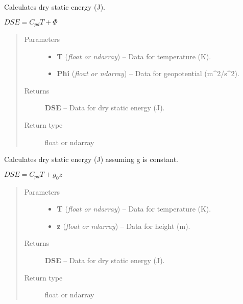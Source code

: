 \documentclass[letterpaper,10pt,english]{sphinxmanual}
\begin{document}

\begin{fulllineitems}
\label{atmos:atmos.equations.DSE_from_T_Phi}
Calculates dry static energy (J).

\(DSE = C_{pd} T + \Phi\)
\begin{quote}\begin{description}
\item[{Parameters}] \leavevmode\begin{itemize}
\item {} 
\textbf{T} (\emph{float or ndarray}) -- Data for temperature (K).

\item {} 
\textbf{Phi} (\emph{float or ndarray}) -- Data for geopotential (m\textasciicircum{}2/s\textasciicircum{}2).

\end{itemize}

\item[{Returns}] \leavevmode
\textbf{DSE} --
Data for dry static energy (J).

\item[{Return type}] \leavevmode
float or ndarray

\end{description}\end{quote}

\end{fulllineitems}


\begin{fulllineitems}
\label{atmos:atmos.equations.DSE_from_T_z}
Calculates dry static energy (J) assuming g is constant.

\(DSE = C_{pd} T + g_0 z\)
\begin{quote}\begin{description}
\item[{Parameters}] \leavevmode\begin{itemize}
\item {} 
\textbf{T} (\emph{float or ndarray}) -- Data for temperature (K).

\item {} 
\textbf{z} (\emph{float or ndarray}) -- Data for height (m).

\end{itemize}

\item[{Returns}] \leavevmode
\textbf{DSE} --
Data for dry static energy (J).

\item[{Return type}] \leavevmode
float or ndarray

\end{description}\end{quote}

\end{fulllineitems}
\end{document}
